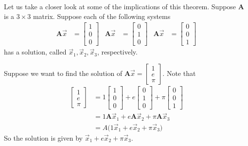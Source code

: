 \documentclass[11pt]{article}
\newcommand{\mat}[1]{\mathbf{#1}}
\newcommand{\vek}[1]{\vec{#1}}
\begin{document}
\vspace{1cm}

Let us take a closer look at some of the implications of this theorem. Suppose $\mat{A}$ is a $3 \times 3$ matrix. Suppose each of the following systems
\begin{align*}
\mat{A} \vek{x} &= \begin{bmatrix}1 \\ 0 \\ 0\end{bmatrix}
&
\mat{A} \vek{x} &= \begin{bmatrix}0 \\ 1 \\ 0\end{bmatrix}
&
\mat{A} \vek{x} &= \begin{bmatrix}0 \\ 0 \\ 1\end{bmatrix}
\end{align*}
has a solution, called $\vek{x}_1, \vek{x}_2, \vek{x}_3$, respectively.

Suppose we want to find the solution of $\mat{A} \vek{x} = \begin{bmatrix}1 \\ e \\ \pi\end{bmatrix}$. Note that
\begin{align*}
\begin{bmatrix}1 \\ e \\ \pi\end{bmatrix}
&=
1 \begin{bmatrix}1 \\ 0 \\ 0\end{bmatrix} +
e \begin{bmatrix}0 \\ 1 \\ 0\end{bmatrix} +
\pi \begin{bmatrix}0 \\ 0 \\ 1\end{bmatrix}
\\
&= 1 \mat{A} \vek{x}_1 + e \mat{A} \vek{x}_2 + \pi \mat{A} \vek{x}_3
\\
&= A \Big( 1 \vek{x}_1 + e \vek{x}_2 + \pi \vek{x}_3 \Big)
\end{align*}
So the solution is given by $\vek{x}_1 + e \vek{x}_2 + \pi \vek{x}_3$.
\end{document}
